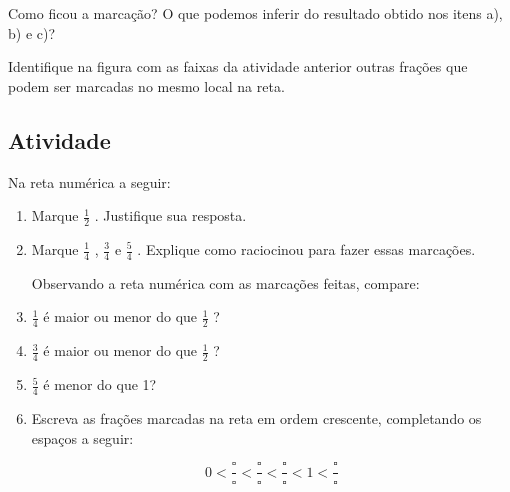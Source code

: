 \documentclass[a4,12pt]{book}
\begin{document}
  
\begin{center}
\end{center}

Como ficou a marcação? O que podemos inferir do resultado obtido nos itens a), b) e c)?

Identifique na figura com as faixas da atividade anterior outras frações que podem ser marcadas no mesmo local na reta.


\subsection{Atividade}


Na reta numérica a seguir:
\begin{enumerate} [\quad a)] %
  \item     Marque     $\frac{1}{2}$    . Justifique sua resposta.
  \item     Marque     $\frac{1}{4}$    ,     $\frac{3}{4}$     e     $\frac{5}{4}$    . Explique como raciocinou para fazer essas marcações. 
  
\begin{center}
\end{center}

Observando a reta numérica com as marcações feitas, compare: 

  \item $\frac{1}{4}$     é maior ou menor do que     $\frac{1}{2}$    ? 
  \item $\frac{3}{4}$ é maior ou menor do que $\frac{1}{2}$    ?
  \item $\frac{5}{4}$  é menor do que 1?
  \item Escreva as frações marcadas na reta em ordem crescente, completando os espaços a seguir:

$$0 < \frac{\square}{\square} < \frac{\square}{\square}< \frac{\square}{\square} < 1 < \frac{\square}{\square}$$

\end{enumerate} %
\end{document}
